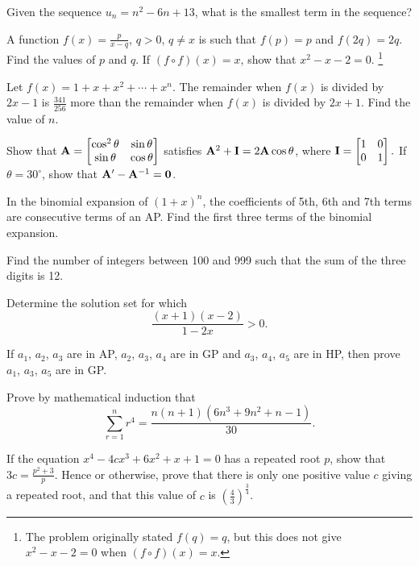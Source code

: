 \begin{problems}
    \problem Given the sequence $u_{n} = n^2 - 6n + 13$, what is the smallest
    term in the sequence?

    \problem A function $f(x) = \frac{p}{x - q}$, $q > 0$, $q \ne x$ is such
    that $f(p) = p$ and $f(2q) = 2q$. Find the values of $p$ and $q$. If $(f
    \circ f)(x) = x$, show that $x^2 - x - 2 = 0$.  \footnote{The problem
    originally stated $f(q) = q$, but this does not give $x^2 - x - 2 = 0$ when
    $(f \circ f)(x) = x$.} 
    
    \problem Let $f(x) = 1 + x + x^2 + \cdots + x^n$. The remainder when $f(x)$
    is divided by $2x - 1$ is $\frac{341}{256}$ more than the remainder when
    $f(x)$ is divided by $2x + 1$. Find the value of $n$.

    \problem[error] Show that 
    $\mathbf{A} = \begin{bmatrix}
                    \cos^2\theta & \sin\theta \\
                    \sin\theta   & \cos\theta
                \end{bmatrix}
    $
    satisfies $\mathbf{A}^2 + \mathbf{I} = 2\mathbf{A}\cos \theta$, where 
    $\mathbf{I} = \begin{bmatrix}
                    1 & 0 \\ 
                    0 & 1
                \end{bmatrix}.
    $ 
    If $\theta = 30^\circ$, show that $\mathbf{A}' - \mathbf{A}^{-1} = \mathbf{0}$.

    \problem In the binomial expansion of $(1 + x)^n$, the coefficients of 5th,
    6th and 7th terms are consecutive terms of an AP. Find the first three terms
    of the binomial expansion.

    \problem Find the number of integers between 100 and 999 such that the sum
    of the three digits is 12.

    \problem Determine the solution set for which 
    \[ \frac{(x + 1)(x - 2)}{1 - 2x} > 0. \]

    \problem If $a_{1}$, $a_{2}$, $a_{3}$ are in AP, $a_{2}$, $a_{3}$, $a_{4}$
    are in GP and $a_{3}$, $a_{4}$, $a_{5}$ are in HP, then prove $a_{1}$,
    $a_{3}$, $a_{5}$ are in GP.

    \problem Prove by mathematical induction that 
    \[\sum_{r = 1}^n r^{4} = \frac{n(n + 1)(6n^3 + 9n^2 + n - 1)}{30}.\]

    \problem[error] If the equation $x^4 - 4cx^3 + 6x^2 + x + 1 = 0$ has a
    repeated root $p$, show that $3c = \frac{p^2 + 3}{p}$. Hence or otherwise,
    prove that there is only one positive value $c$ giving a repeated root, and
    that this value of $c$ is $(\frac{4}{3})^{\frac{3}{4}}$.


\end{problems}
